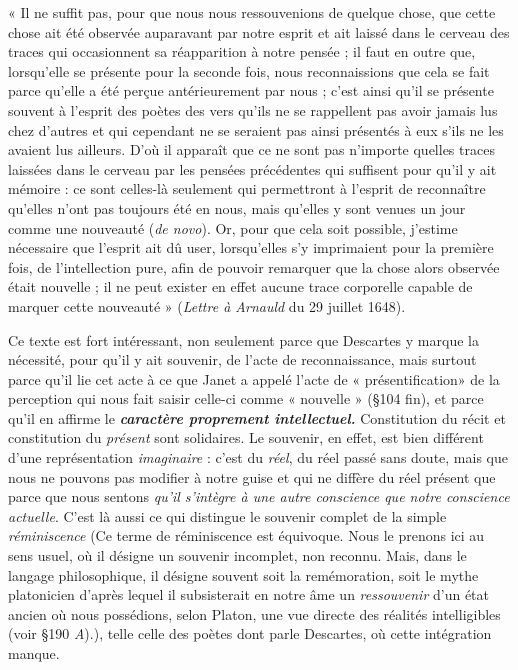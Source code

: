 \vspace{0.24cm}
{\footnotesize 
« Il ne suffit pas, pour que nous nous ressouvenions de quelque chose, que
cette chose ait été observée auparavant par notre esprit et ait laissé dans le
cerveau des traces qui occasionnent sa réapparition à notre pensée ; il faut
en outre que, lorsqu'elle se présente pour la seconde fois, nous reconnaissions
que cela se fait parce qu’elle a été perçue antérieurement par nous ;
c'est ainsi qu'il se présente souvent à l'esprit des poètes des vers qu’ils ne
se rappellent pas avoir jamais lus chez d’autres et qui cependant ne se
seraient pas ainsi présentés à eux s'ils ne les avaient lus ailleurs. D'où il
apparaît que ce ne sont pas n'importe quelles traces laissées dans le cerveau
par les pensées précédentes qui suffisent pour qu’il y ait mémoire : ce sont
celles-là seulement qui permettront à l'esprit de reconnaître qu’elles n’ont
pas toujours été en nous, mais qu’elles y sont venues un jour comme une
nouveauté ({\it de novo}). Or, pour que cela soit possible, j'estime nécessaire que
l'esprit ait dû user, lorsqu'elles s’y imprimaient pour la première fois, de
l’intellection pure, afin de pouvoir remarquer que la chose alors observée
était nouvelle ; il ne peut exister en effet aucune trace corporelle capable
de marquer cette nouveauté » ({\it Lettre à Arnauld} du 29 juillet 1648).}
\vspace{0.31cm}

Ce texte est fort intéressant, non seulement parce que Descartes
y marque la nécessité, pour qu’il y ait souvenir, de l’acte de reconnaissance,
mais surtout parce qu’il lie cet acte à ce que Janet a appelé
l’acte de « présentification» de la perception qui nous fait saisir celle-ci
comme « nouvelle » (\S 104 fin), et parce qu'il en affirme le \textbf{\textit {caractère
proprement intellectuel.}} Constitution du récit et constitution du
{\it présent} sont solidaires. Le souvenir, en effet, est bien différent d’une
représentation {\it imaginaire} : c’est du {\it réel}, du réel passé sans doute,
mais que nous ne pouvons pas modifier à notre guise et qui ne diffère
du réel présent que parce que nous sentons {\it qu’il s'intègre à une autre
conscience que notre conscience actuelle}. C’est là aussi ce qui distingue
le souvenir complet de la simple {\it réminiscence}
{\scriptsize (Ce terme de {\it }réminiscence est équivoque. Nous le prenons ici au sens usuel, où il
désigne un souvenir incomplet, non reconnu. Mais, dans le langage philosophique, il
désigne souvent soit la remémoration, soit le mythe platonicien d’après lequel il
subsisterait en notre âme un {\it ressouvenir} d’un état ancien où nous possédions, selon Platon,
une vue directe des réalités intelligibles (voir \S 190 {\it A}).)}, telle celle des poètes
dont parle Descartes, où cette intégration manque.

